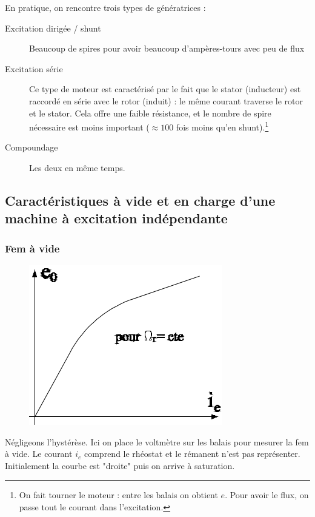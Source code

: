 	En pratique, on rencontre trois types de génératrices :
	\begin{description}
	\item[Excitation dirigée / shunt] Beaucoup de spires pour avoir beaucoup 
	d'ampères-tours avec peu de flux
	\item[Excitation série] Ce type de moteur est caractérisé par le fait que 
	le stator (inducteur) est raccordé en série avec le rotor (induit) : le même 
	courant traverse le rotor et le stator. Cela offre une faible résistance, et 
	le nombre de spire nécessaire est moins important ($\approx 100$ fois moins qu'en 
	shunt).\footnote{ On fait tourner le moteur : entre les balais on obtient $e$. Pour avoir 
	le flux, on passe tout le courant dans l'excitation.}
	\item[Compoundage] Les deux en même temps.
	\end{description}
	
	
	\subsection{Caractéristiques à vide et en charge d'une machine à excitation 
	indépendante}
		\subsubsection{Fem à vide}
			\begin{figure}
	\vspace{-5mm}
	\includegraphics[scale=0.34]{ch4/image18.png}
	\end{figure}
		Négligeons l'hystérèse. Ici on place le voltmètre sur les balais pour mesurer 
		la fem à vide. Le courant $i_e$ comprend le rhéostat et le rémanent n'est 
		pas représenter. Initialement la courbe est "droite" puis on arrive à saturation.
		

